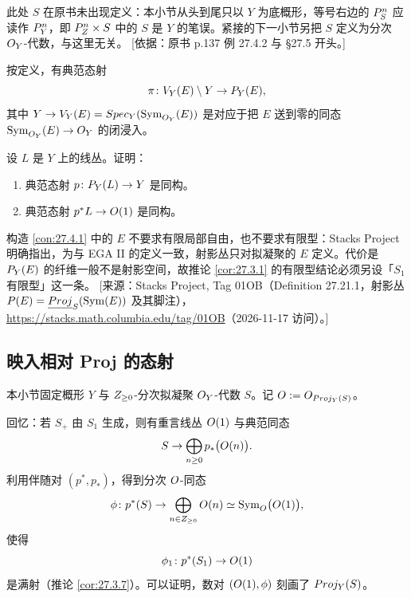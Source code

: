\begin{yizhu}
此处 $S$ 在原书未出现定义：本小节从头到尾只以 $Y$ 为底概形，等号右边的 $P^n_S$ 应读作 $P^n_Y$，即
$P^n_Z\times S$ 中的 $S$ 是 $Y$ 的笔误。紧接的下一小节另把 $S$ 定义为分次 $O_Y$-代数，与这里无关。
[依据：原书 p.137 例 27.4.2 与 §27.5 开头。]
\end{yizhu}

\begin{remark}\label{rem:27.4.3}
按定义，有典范态射
\[
\pi \colon V_Y(E) \setminus Y \to P_Y(E),
\]
其中 $Y \to V_Y(E) = Spec_Y(\operatorname{Sym}_{O_Y}(E))$ 是对应于把 $E$ 送到零的同态 $\operatorname{Sym}_{O_Y}(E) \to O_Y$ 的闭浸入。
\end{remark}

\begin{exercise}\label{exc:27.4.4}
设 $L$ 是 $Y$ 上的线丛。证明：
\begin{enumerate}[label=(\arabic*),leftmargin=2.4em,itemsep=0.25ex]
  \item 典范态射 $p \colon P_Y(L) \to Y$ 是同构。
  \item 典范态射 $p^*L \to O(1)$ 是同构。
\end{enumerate}
\end{exercise}

\begin{yizhu}
构造 \ref{con:27.4.1} 中的 $E$ 不要求有限局部自由，也不要求有限型：Stacks Project 明确指出，为与 EGA II 的定义一致，射影丛只对拟凝聚的 $E$ 定义。代价是 $P_Y(E)$ 的纤维一般不是射影空间，故推论 \ref{cor:27.3.1} 的有限型结论必须另设「$S_1$ 有限型」这一条。
[来源：Stacks Project, Tag 01OB（Definition 27.21.1，射影丛 $P(E) = \underline{Proj}_S(\operatorname{Sym}(E))$ 及其脚注），\url{https://stacks.math.columbia.edu/tag/01OB}（2026-11-17 访问）。]
\end{yizhu}

\subsection{映入相对 Proj 的态射}\label{sec:27.5}

本小节固定概形 $Y$ 与 $Z_{\ge 0}$-分次拟凝聚 $O_Y$-代数 $S$。记 $O := O_{Proj_Y(S)}$。

回忆：若 $S_+$ 由 $S_1$ 生成，则有重言线丛 $O(1)$ 与典范同态
\[
S \to \bigoplus_{n \ge 0} p_*\bigl(O(n)\bigr).
\]
利用伴随对 $(p^*, p_*)$，得到分次 $O$-同态
\begin{equation}\label{eq:27.4}
\phi \colon p^*(S) \to \bigoplus_{n \in Z_{\ge 0}} O(n) \simeq \operatorname{Sym}_{O}\bigl(O(1)\bigr),
\end{equation}
使得
\[
\phi_1 \colon p^*(S_1) \to O(1)
\]
是满射（推论 \ref{cor:27.3.7}）。可以证明，数对 $(O(1), \phi)$ 刻画了 $Proj_Y(S)$。

